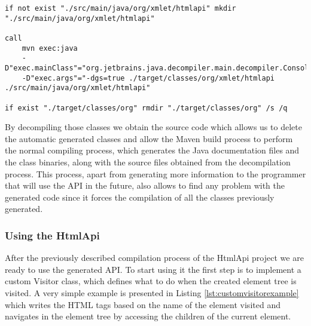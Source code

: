 
\begin{minipage}{\linewidth}
\begin{lstlisting}[caption={Maven API decompile batch file (decompile\_class\_binaries.bat)},label={lst:decompilationbat}]
if not exist "./src/main/java/org/xmlet/htmlapi" mkdir "./src/main/java/org/xmlet/htmlapi"

call 
    mvn exec:java 
    -D"exec.mainClass"="org.jetbrains.java.decompiler.main.decompiler.ConsoleDecompiler" 
    -D"exec.args"="-dgs=true ./target/classes/org/xmlet/htmlapi ./src/main/java/org/xmlet/htmlapi"

if exist "./target/classes/org" rmdir "./target/classes/org" /s /q
\end{lstlisting}
\end{minipage}

\noindent
By decompiling those classes we obtain the source code which allows us to delete the automatic generated classes and allow the Maven build process to perform the normal compiling process, which generates the Java documentation files and the class binaries, along with the source files obtained from the decompilation process. This process, apart from generating more information to the programmer that will use the \ac{API} in the future, also allows to find any problem with the generated code since it forces the compilation of all the classes previously generated.

\subsubsection{Using the HtmlApi}

After the previously described compilation process of the HtmlApi project we are ready to use the generated \ac{API}. To start using it the first step is to implement a custom Visitor class, which defines what to do when the created element tree is visited. A very simple example is presented in Listing \ref{lst:customvisitorexample} which writes the \ac{HTML} tags based on the name of the element visited and navigates in the element tree by accessing the children of the current element.

\bigskip


